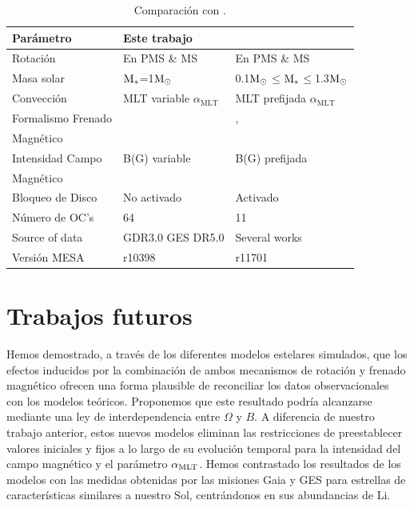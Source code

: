 \begin{table}
	\centering
	\begin{threeparttable}
		\begin{tabular}{lll} 
			\hline
			Parámetro & Este trabajo & \cite{Gossage2021}\\
			\hline
			
			Rotación & En PMS \& MS & En PMS \& MS\\
			Masa solar & $\mathrm{M}_*$=1$\mathrm{M}_\odot$ & 0.1$\mathrm{M}_\odot$$\le$$\mathrm{M}_*$$\le$1.3$\mathrm{M}_\odot$ \\
			Convección & MLT variable $\alpha_{\textrm{MLT}}$ & MLT prefijada $\alpha_{\textrm{MLT}}$\\
			Formalismo Frenado & \cite{Gallet2013} & \cite{Matt2015}, \\ Magnético & & \cite{Garraffo2018}\\
			Intensidad Campo & B(G) variable & B(G) prefijada\\ Magnético & & \\
			Bloqueo de Disco & No activado & Activado\\
			Número de OC's & 64 & 11 \\
			Source of data & GDR3.0 GES DR5.0 & Several works \\
			Versión MESA & r10398 & r11701\\
			\hline
		\end{tabular}
	\end{threeparttable}
	\caption{Comparación con \cite{Gossage2021}.}\label{tab:gassage_vs_navarro}    
\end{table}

\section{Trabajos futuros} \label{sec_conclusions}
Hemos demostrado, a través de los diferentes modelos estelares simulados, que los efectos inducidos por la combinación de ambos mecanismos de rotación y frenado magnético ofrecen una forma plausible de reconciliar los datos observacionales con los modelos teóricos. Proponemos que este resultado podría alcanzarse mediante una ley de interdependencia entre $\Omega$ y $B$. A diferencia de nuestro trabajo anterior, estos nuevos modelos eliminan las restricciones de preestablecer valores iniciales y fijos a lo largo de su evolución temporal para la intensidad del campo magnético y el parámetro $\alpha_{\mathrm{MLT}}$. Hemos contrastado los resultados de los modelos con las medidas obtenidas por las misiones Gaia y GES para estrellas de características similares a nuestro Sol, centrándonos en sus abundancias de Li.\par

